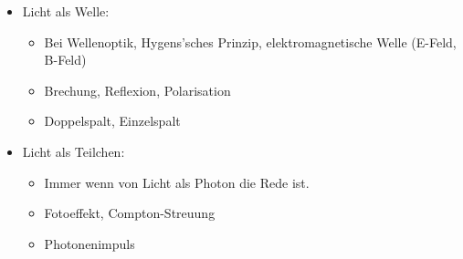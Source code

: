 \begin{itemize}
\item Licht als Welle:
	\begin{itemize}
	\item Bei Wellenoptik, Hygens'sches Prinzip, elektromagnetische Welle (E-Feld, B-Feld)
	\item Brechung, Reflexion, Polarisation
	\item Doppelspalt, Einzelspalt
	\end{itemize}
\item Licht als Teilchen:
	\begin{itemize}
	\item Immer wenn von Licht als Photon die Rede ist.
	\item Fotoeffekt, Compton-Streuung
	\item Photonenimpuls
	\end{itemize}
\end{itemize}